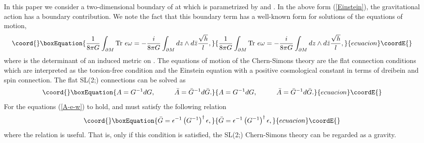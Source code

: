 \documentclass[a4paper,11pt]{article}
\begin{document}
In this paper we consider a two-dimensional boundary of \coordHE{} 
at \myHighlight{$\tau \longrightarrow -\infty$}\coordHE{} which is parametrized 
by \coordHE{} and \coordHE{}.
In the above form (\ref{Einstein}), the gravitational action 
has a boundary contribution.
We note the fact that this boundary term has a well-known form 
for solutions of the equations of motion,
\begin{equation}\coord{}\boxEquation{
\label{b-term}
 \frac{1}{8\pi G}\int_{\partial M} \mbox{Tr} \ e \omega 
  = -\frac{i}{8\pi G}\int_{\partial M}dz\wedge d\bar{z}
      \frac{\sqrt{h}}{l},
}{
\frac{1}{8\pi G}\int_{\partial M} \mbox{Tr} \ e \omega 
  = -\frac{i}{8\pi G}\int_{\partial M}dz\wedge d\bar{z}
      \frac{\sqrt{h}}{l},
}{ecuacion}\coordE{}\end{equation}
where \coordHE{} is the determinant of an induced metric on \coordHE{}.
The equations of motion of the Chern-Simons theory are the flat
connection conditions which are interpreted as the torsion-free
condition and the Einstein equation with a positive cosmological constant 
\coordHE{} in terms of dreibein and spin connection.
The flat SL(2;\coordHE{}) connections can be solved as  
\begin{equation}\coord{}\boxEquation{
\label{A-G}
A=G^{-1}dG, \hspace{10mm} 
\bar{A}=\bar{G}^{-1}d\bar{G}.
}{
A=G^{-1}dG, \hspace{10mm} 
\bar{A}=\bar{G}^{-1}d\bar{G}.
}{ecuacion}\coordE{}\end{equation}
For the equations (\ref{A-e-w}) to hold,
\coordHE{} and \coordHE{} must satisfy the following relation 
\begin{equation}\coord{}\boxEquation{
\label{G-G}
\bar{G}=\epsilon^{-1} \left(G^{-1}\right)^\dagger \epsilon,
}{
\bar{G}=\epsilon^{-1} \left(G^{-1}\right)^\dagger \epsilon,
}{ecuacion}\coordE{}\end{equation}
where the relation 
\coordHE{}
is useful.
That is, only if this condition is satisfied, the SL(2;\coordHE{}) 
Chern-Simons theory can be regarded as a gravity.
\end{document}
